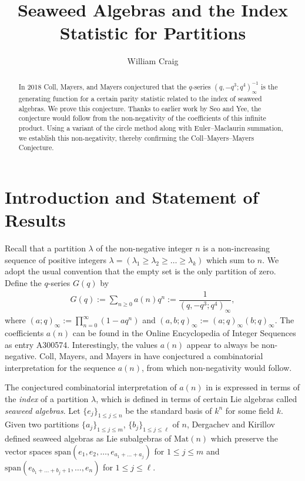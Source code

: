 \documentclass[11pt,reqno]{amsart}
\title{Seaweed Algebras and the Index Statistic for Partitions}
\author{William Craig}
\theoremstyle{definition}
\theoremstyle{plain}
\theoremstyle{named}
\numberwithin{equation}{section}
\theoremstyle{example}
\def\lp{\left(}
\def\rp{\right)}
\begin{document}
\maketitle

\begin{abstract}
In 2018 Coll, Mayers, and Mayers conjectured that the $q$-series $\lp q, -q^3; q^4 \rp_\infty^{-1}$ is the generating function for a certain parity statistic related to the index of seaweed algebras. We prove this conjecture. Thanks to earlier work by Seo and Yee, the conjecture would follow from the non-negativity of the coefficients of this infinite product. Using a variant of the circle method along with Euler--Maclaurin summation, we establish this non-negativity, thereby confirming the Coll--Mayers--Mayers Conjecture.
\end{abstract}

\section{Introduction and Statement of Results}

Recall that a partition $\lambda$ of the non-negative integer $n$ is a non-increasing sequence of positive integers $\lambda = \lp \lambda_1 \geq \lambda_2 \geq \dots \geq \lambda_k \rp$ which sum to $n$. We adopt the usual convention that the empty set is the only partition of zero. Define the $q$-series $G(q)$ by
\begin{align*}
    G(q) := \sum_{n \geq 0} a(n) q^n := \dfrac{1}{\lp q, -q^3; q^4 \rp_\infty},
\end{align*}
where $\lp a; q \rp_\infty := \prod_{n=0}^\infty \lp 1 - a q^n \rp$ and $\lp a, b; q \rp_\infty := \lp a; q \rp_\infty \lp b; q \rp_\infty$. The coefficients $a(n)$ can be found in the Online Encyclopedia of Integer Sequences \cite{OEIS} as entry A300574. Interestingly, the values $a(n)$ appear to always be non-negative. Coll, Mayers, and Mayers in \cite{CollMayersMayers} have conjectured a combinatorial interpretation for the sequence $a(n)$, from which non-negativity would follow.

The conjectured combinatorial interpretation of $a(n)$ in \cite{CollMayersMayers} is expressed in terms of the {\it index} of a partition $\lambda$, which is defined in terms of certain Lie algebras called {\it seaweed algebras}. Let $\{ e_j \}_{1 \leq j \leq n}$ be the standard basis of $k^n$ for some field $k$. Given two partitions $\{ a_j \}_{1 \leq j \leq m}$, $\{ b_j \}_{1 \leq j \leq \ell}$ of $n$, Dergachev and Kirillov \cite{DergachevKirillov} defined seaweed algebras as Lie subalgebras of $\text{Mat}(n)$ which preserve the vector spaces $\text{span}\lp e_1, e_2, \dots, e_{a_1 + \dots + a_j} \rp$ for $1 \leq j \leq m$ and $\text{span}\lp e_{b_1 + \dots + b_j + 1}, \dots, e_n \rp$ for $1 \leq j \leq \ell$. 
\end{document}
